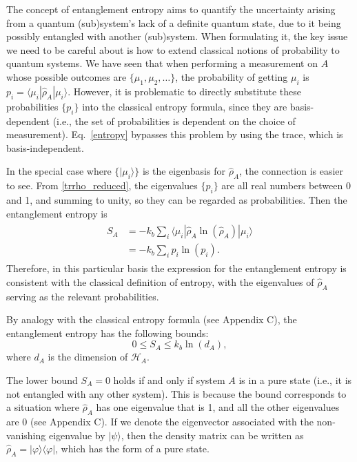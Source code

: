 \documentclass[pra,12pt]{revtex4}
\begin{document}
The concept of entanglement entropy aims to quantify the uncertainty
arising from a quantum (sub)system's lack of a definite quantum state,
due to it being possibly entangled with another (sub)system.  When
formulating it, the key issue we need to be careful about is how to
extend classical notions of probability to quantum systems.  We have
seen that when performing a measurement on $A$ whose possible outcomes
are $\{\mu_1, \mu_2, \dots\}$, the probability of getting $\mu_i$ is
$p_i = \langle \mu_i | \hat{\rho}_A|\mu_i\rangle$.  However, it is
problematic to directly substitute these probabilities $\{p_i\}$ into
the classical entropy formula, since they are basis-dependent (i.e.,
the set of probabilities is dependent on the choice of measurement).
Eq.~\eqref{entropy} bypasses this problem by using the trace, which is
basis-independent.

In the special case where $\{|\mu_i\rangle\}$ is the eigenbasis for
$\hat{\rho}_A$, the connection is easier to see.  From
\eqref{trrho_reduced}, the eigenvalues $\{p_i\}$ are all real numbers
between 0 and 1, and summing to unity, so they can be regarded as
probabilities.  Then the entanglement entropy is
\begin{align}
  \begin{aligned}S_A &= -k_b \sum_i \langle \mu_i | \hat{\rho}_A \ln(\hat{\rho}_A) | \mu_i\rangle  \\ &= - k_b \sum_i p_i \ln(p_i).
  \end{aligned}
\end{align}
Therefore, in this particular basis the expression for the
entanglement entropy is consistent with the classical definition of
entropy, with the eigenvalues of $\hat{\rho}_A$ serving as the
relevant probabilities.

By analogy with the classical entropy formula (see Appendix C), the
entanglement entropy has the following bounds:
\begin{equation}
  0 \le S_A \le k_b\ln(d_A),
  \label{Sabounds}
\end{equation}
where $d_A$ is the dimension of $\mathscr{H}_A$.

The lower bound $S_A = 0$ holds if and only if system $A$ is in a pure
state (i.e., it is not entangled with any other system).  This is
because the bound corresponds to a situation where $\hat{\rho}_A$ has
one eigenvalue that is 1, and all the other eigenvalues are 0 (see
Appendix C).  If we denote the eigenvector associated with the
non-vanishing eigenvalue by $|\psi\rangle$, then the density matrix
can be written as $\hat{\rho}_A = |\varphi\rangle\langle\varphi|$, which
has the form of a pure state.
\end{document}
